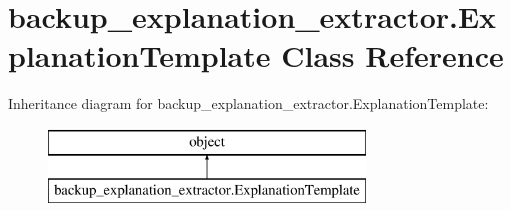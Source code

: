 \hypertarget{classbackup__explanation__extractor_1_1_explanation_template}{}\section{backup\+\_\+explanation\+\_\+extractor.\+Explanation\+Template Class Reference}
\label{classbackup__explanation__extractor_1_1_explanation_template}
Inheritance diagram for backup\+\_\+explanation\+\_\+extractor.\+Explanation\+Template\+:\begin{figure}[H]
\begin{center}
\leavevmode
\includegraphics[height=2.000000cm]{classbackup__explanation__extractor_1_1_explanation_template}
\end{center}
\end{figure}
